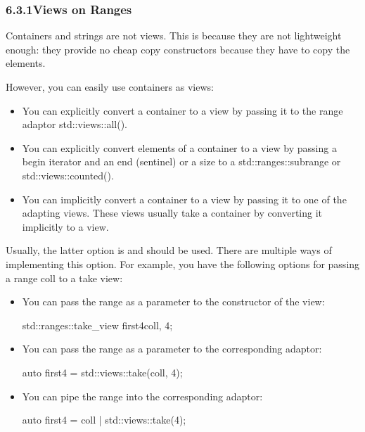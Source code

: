 \subsubsection*{ 6.3.1\hspace{0.2cm}Views on Ranges}

Containers and strings are not views. This is because they are not lightweight enough: they provide no cheap copy constructors because they have to copy the elements.

However, you can easily use containers as views:

\begin{itemize}
\item
You can explicitly convert a container to a view by passing it to the range adaptor std::views::all().

\item
You can explicitly convert elements of a container to a view by passing a begin iterator and an end (sentinel) or a size to a std::ranges::subrange or std::views::counted().

\item
You can implicitly convert a container to a view by passing it to one of the adapting views. These views usually take a container by converting it implicitly to a view.
\end{itemize}

Usually, the latter option is and should be used. There are multiple ways of implementing this option. For example, you have the following options for passing a range coll to a take view:

\begin{itemize}
\item
You can pass the range as a parameter to the constructor of the view:

\begin{cpp}
std::ranges::take_view first4{coll, 4};
\end{cpp}

\item
You can pass the range as a parameter to the corresponding adaptor:

\begin{cpp}
auto first4 = std::views::take(coll, 4);
\end{cpp}

\item
You can pipe the range into the corresponding adaptor:

\begin{cpp}
auto first4 = coll | std::views::take(4);
\end{cpp}
\end{itemize}

